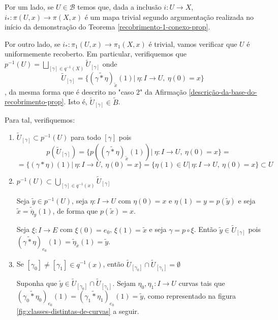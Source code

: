 \begin{dem}
    Por um lado, se $U\in \mathcal{B}$ temos que, dada a inclusão $i:U\rightarrow X$, $i_*:\pi(U,x)\rightarrow \pi(X,x)$ é um mapa trivial segundo argumentação realizada no início da demonstração do Teorema \ref{recobrimento-1-conexo-prop}.\newline

    Por outro lado, se $i_*:\pi_1(U,x)\rightarrow \pi_1(X,x)$ é trivial, vamos verificar que $U$ é uniformemente recoberto. Em particular, verifiquemos que $p^{-1}(U)=\underset{[\gamma]\in q^{-1}(X)}{\bigsqcup} \tilde{U}_{[\gamma]}$ onde $$\tilde{U}_{[\gamma]}=\{(\widetilde{\gamma*\eta})_{\tilde{x}}(1)|~\eta:I\rightarrow U,~\eta(0)=x\}$$, da mesma forma que é descrito no "caso 2" da Afirmação \ref{descrição-da-base-do-recobrimento-prop}. Isto é, $\tilde{U}_{[\gamma]}\in \tilde{B}$.

    Para tal, verifiquemos:

    \begin{enumerate}
        \item $\tilde{U}_{[\gamma]}\subset p^{-1}(U)$ para todo $[\gamma]$ pois
        $$p(\tilde{U}_{[\gamma]})=\{p((\widetilde{\gamma*\eta})_{\tilde{x}}(1))|~\eta:I\rightarrow U,~\eta(0)=x\}=$$$$=\{(\gamma*\eta)(1)|~\eta:I\rightarrow U,~\eta(0)=x\}=\{\eta(1)\in U|~\eta:I\rightarrow U,~\eta(0)=x\}\subset U$$\newline

        \item $p^{-1}(U)\subset \underset{[\gamma]\in q^{-1}(x)}{\bigcup} \tilde{U}_{[\gamma]}$

        Seja $\tilde{y}\in p^{-1}(U)$, seja $\eta:I\rightarrow U$ com $\eta(0)=x$ e $\eta(1)=y=p(\tilde{y})$ e seja $\tilde{x}=\tilde{\overline{\eta}}_{\tilde{y}}(1)$, de forma que $p(\tilde{x})=x$.

        Seja $ \xi:I\rightarrow E$ com $\xi(0)=e_0$, $\xi(1)=\tilde{x}$ e seja $\gamma=p\circ \xi$. Então $ \tilde{y}\in \tilde{U}_{[\gamma]}$ pois $(\widetilde{\gamma * \eta})_{e_0}(1)=\tilde{\eta}_{\tilde{x}}(1)=\tilde{y}$.\newline

        \item Se $[\gamma_0]\neq [\gamma_1]\in q^{-1}(x)$, então $ \tilde{U}_{[\gamma_0]}\cap \tilde{U}_{[\gamma_1]}=\emptyset$

        Suponha que $\tilde{y}\in \tilde{U}_{[\gamma_0]}\cap\tilde{U}_{[\gamma_1]}$. Sejam $\eta_0, \eta_1: I\rightarrow U$ curvas tais que $(\widetilde{\gamma_0*\eta_0})_{e_0}(1)=(\widetilde{\gamma_1*\eta_1})_{e_0}(1)=\tilde{y}$, como representado na figura \ref{fig:classes-distintas-de-curvas} a seguir.


\end{enumerate}
\end{dem}
